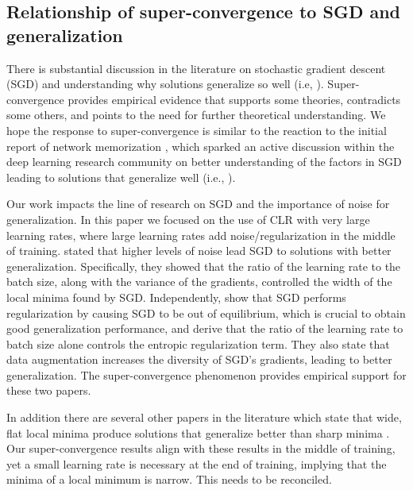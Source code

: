 \documentclass{article}
\begin{document}
	\subsection{Relationship of super-convergence to SGD and generalization}
	\label{sec:relationship}
	
	
	There is substantial discussion in the literature on stochastic gradient descent (SGD) and understanding why solutions generalize so well (i.e, \cite{chaudhari2016entropy,chaudhari2017stochastic,im2016empirical,jastrzkebski2017three,smith2017understanding,kawaguchi2017generalization}).
	Super-convergence provides empirical evidence that supports some theories, contradicts some others, and points to the need for further theoretical understanding.
	We hope the response to super-convergence is similar to the reaction to the initial report of network memorization \citep{zhang2016understanding}, which sparked an active discussion within the deep learning research community on better understanding of the factors in SGD leading to solutions that generalize well (i.e., \citep{arpit2017closer}). 
	
	Our work impacts the line of research on SGD and the importance of noise for generalization.
	In this paper we focused on the use of CLR with very large learning rates, where large learning rates add noise/regularization in the middle of training.
	\cite{jastrzkebski2017three} stated that higher levels of noise lead SGD to solutions with better generalization.
	Specifically, they showed that the ratio of the learning rate to the batch size, along with the variance of the gradients, controlled the width of the local minima found by SGD.
	Independently, \cite{chaudhari2017stochastic} show that SGD performs regularization by causing SGD to be out of equilibrium, which is crucial to obtain good generalization performance, and derive that the ratio of the learning rate to batch size alone controls the entropic regularization term.
	They also state that data augmentation increases the diversity of SGD's gradients, leading to better generalization.
	The super-convergence phenomenon provides empirical support for these two  papers.
	
	In addition there are several other papers in the literature which state that wide, flat local minima produce solutions that generalize better than sharp minima \citep{hochreiter1997flat,keskar2016large,wu2017towards}.
	Our super-convergence results align with these results in the middle of training, yet a small learning rate is necessary at the end of training, implying that the minima of a local minimum is narrow. This needs to be reconciled.
	
\end{document}
